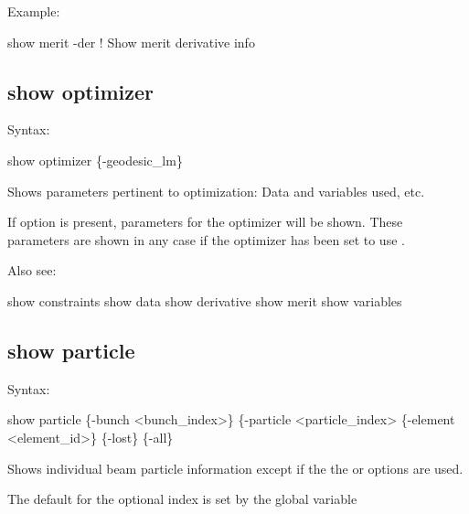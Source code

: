 {{{{{{{{{Example:
\begin{example}
  show merit -der     ! Show merit derivative info
\end{example}


\subsection{show optimizer}
\label{s:show.optimizer}

Syntax:
\begin{example}
  show optimizer \{-geodesic_lm\}
\end{example}


Shows parameters pertinent to optimization: Data and variables used,
etc. 

If  option is present, parameters for the  optimizer will
be shown. These parameters are shown in any case if the optimizer has been set to use
.

Also see:
\begin{example}
  show constraints
  show data
  show derivative
  show merit
  show variables
\end{example}


\subsection{show particle}
\label{s:show.particle}

Syntax:
\begin{example}
    show particle \{-bunch <bunch_index>\} \{-particle <particle_index>
                  \{-element <element_id>\} \{-lost\} \{-all\}
\end{example}


Shows individual beam particle information except if the the  or  options are used. 

The default for the optional  index is set by the global variable \vn{global%
The default \vn{-element} is \vn{init} which is the initial beam distribution.
The default \vn{-particle} to show is the particle with index 1.

The \vn{-lost} option shows which particles are lost during beam tracking. Note: Using the
\vn{-lost} option results in one line printed for each lost particle. It is thus meant for use with
bunches with a small number of particles.

}}}}}}}}}}
